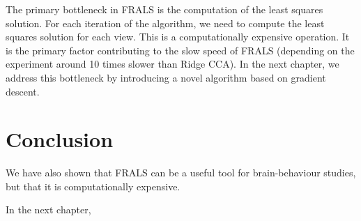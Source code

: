 The primary bottleneck in FRALS is the computation of the least squares solution.
For each iteration of the algorithm, we need to compute the least squares solution for each view.
This is a computationally expensive operation.
It is the primary factor contributing to the slow speed of FRALS (depending on the experiment around 10 times slower than Ridge CCA).
In the next chapter, we address this bottleneck by introducing a novel algorithm based on gradient descent.
\newpage
\section{Conclusion}\label{sec:conclusion}

We have also shown that FRALS can be a useful tool for brain-behaviour studies, but that it is computationally expensive.

In the next chapter,
